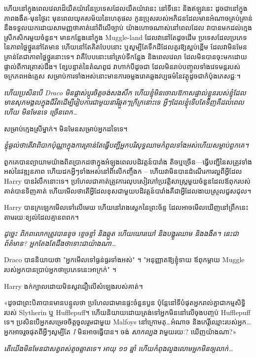 ហើយនៅក្នុងពេលវេលាដ៏យឺតយ៉ាវនៃប្រទេសដែលយឺតយ៉ាវនេះ នៅទីនេះ និងឥឡូវនេះ ដូចជានៅក្នុងភាពងងឹត-មុនថ្ងៃរះ មុនពេលយុគសម័យនៃហេតុផល កូនប្រុសរបស់អភិជនដែលមានអំណាចគ្រប់គ្រាន់នឹងទទួលយកដោយសាមញ្ញថាគាត់នៅពីលើច្បាប់ យ៉ាងហោចណាស់នៅពេលដែល វាបានមកដល់ក្មេងស្រីកសិករមួយចំនួន។ មានកន្លែងនៅក្នុង Muggle-land ដែលវានៅតែដូចដើម ប្រទេសដែលប្រភេទនៃភាពថ្លៃថ្នូរនៅតែមាន ហើយនៅតែគិតបែបនោះ ឬសូម្បីតែទឹកដីដែលគួរឱ្យស្អប់ខ្ពើម ដែលវាមិនមែនគ្រាន់តែជាភាពថ្លៃថ្នូរនោះទេ។ វា​គឺ​បែប​នោះ​នៅ​គ្រប់​ទីកន្លែង និង​ពេល​វេលា ដែល​មិន​បាន​ចុះ​មក​ដោយ​ផ្ទាល់​ពី​ការ​ត្រាស់​ដឹង។ ខ្សែបន្ទាត់នៃតំណពូជ វាហាក់បីដូចជា ដែលមិនរាប់បញ្ចូលទាំងវេទមន្តរបស់ចក្រភពអង់គ្លេស សម្រាប់ការទាំងអស់នោះមានការចម្លងរោគឆ្លងវប្បធម៌នៃវត្ថុដូចជាកំប៉ុងភេសជ្ជៈ។

\emph{ហើយប្រសិនបើ Draco មិនផ្លាស់ប្តូរចិត្តចង់សងសឹក ហើយខ្ញុំមិនចោលឱកាសផ្ទាល់ខ្លួនរបស់ខ្ញុំដែលមានសុភមង្គលក្នុងជីវិតដើម្បីរៀបការជាមួយនារីឆ្កួតៗក្រីក្រនោះទេ អ្វីៗដែលខ្ញុំទើបតែទិញគឺដល់ពេលហើយ មិនមែនទេ ច្រើនពេក…}

សម្រាប់ក្មេងស្រីម្នាក់។ មិនមែនសម្រាប់អ្នកដទៃទេ។

\emph{ខ្ញុំឆ្ងល់ថាតើវាពិបាកប៉ុណ្ណាក្នុងការគ្រាន់តែធ្វើបញ្ជីអ្នកបរិសុទ្ធឈាមកំពូលទាំងអស់ហើយសម្លាប់ពួកគេ។}

ពួកគេបានព្យាយាមយ៉ាងពិតប្រាកដថាក្នុងអំឡុងពេលបដិវត្តន៍បារាំង តិចឬច្រើន—ធ្វើបញ្ជីនៃសត្រូវទាំងអស់នៃវឌ្ឍនភាព ហើយដកអ្វីៗទាំងអស់នៅពីលើកញ្ចឹងក – ហើយវាមិនបានដំណើរការល្អពីអ្វីដែល Harry បានរំលឹកនោះទេ។ ប្រហែលជាគាត់ត្រូវការលុបសៀវភៅប្រវត្តិសាស្ត្រមួយចំនួនដែលឪពុករបស់គាត់បានទិញគាត់ ហើយមើលថាតើអ្វីដែលខុសជាមួយបដិវត្តន៍បារាំងគឺជាអ្វីដែលងាយស្រួលជួសជុល។

Harry បានក្រឡេកមើលទៅលើមេឃ ហើយនៅរាងស្លេកនៃព្រះច័ន្ទ ដែលអាចមើលឃើញនៅព្រឹកនេះតាមរយៈខ្យល់ដែលគ្មានពពក។

\emph{ដូច្នេះ ពិភពលោកត្រូវបានខូច ខ្ទេចខ្ទាំ និងឆ្កួត ហើយឃោរឃៅ និងបង្ហូរឈាម និងងងឹត។ នេះជាព័ត៌មាន? អ្នក​តែង​តែ​ដឹង​ថា​ទោះ​ជា​យ៉ាង​ណា…}

Draco បាននិយាយថា "អ្នកមើលទៅធ្ងន់ធ្ងរទាំងអស់" ។ "អនុញ្ញាតឱ្យខ្ញុំទាយ ឪពុកម្តាយ Muggle របស់អ្នកបានប្រាប់អ្នកថាប្រភេទនេះអាក្រក់" ។

Harry ងក់​ក្បាល​ដោយ​មិន​សូវ​ជឿ​លើ​សំឡេង​របស់​គាត់។

«ដូច​ជា​ព្រះបិតា​បាន​មាន​បន្ទូល​ថា ប្រហែល​ជា​មាន​ផ្ទះ​ចំនួន​បួន ប៉ុន្តែ​នៅ​ទី​បំផុត​អ្នក​រាល់​គ្នា​ជា​កម្មសិទ្ធិ​របស់ Slytherin ឬ Hufflepuff។ ហើយនិយាយដោយត្រង់ទៅអ្នកមិននៅលើចុងបញ្ចប់ Hufflepuff ទេ។ ប្រសិនបើអ្នកសម្រេចចិត្តចូលរួមជាមួយ Malfoys នៅក្រោមតុ…អំណាច និងកេរ្តិ៍ឈ្មោះរបស់អ្នក… អ្នកអាចរួចផុតពីអ្វីៗសូម្បីតែ \emph{I} មិនអាចធ្វើបាន។ ចង់ \emph{សាកល្បង} វាមួយរយៈ? ឃើញ​យ៉ាង​ណា?»

\emph{តើយើងមិនមែនជាសត្វពស់តូចឆ្លាតទេ។ អាយុ ១១ ឆ្នាំ ហើយ​កំពុង​លួង​លោម​អ្នក​មិន​ឲ្យ​លាក់​…}

